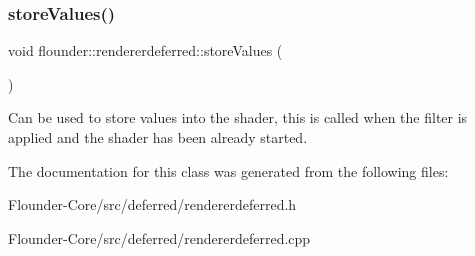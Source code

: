 \subsubsection{\texorpdfstring{store\+Values()}{storeValues()}}
{\footnotesize\ttfamily void flounder\+::rendererdeferred\+::store\+Values (\begin{DoxyParamCaption}{ }\end{DoxyParamCaption})\hspace{0.3cm}{\ttfamily [private]}}



Can be used to store values into the shader, this is called when the filter is applied and the shader has been already started. 



The documentation for this class was generated from the following files\+:\begin{DoxyCompactItemize}
\item 
Flounder-\/\+Core/src/deferred/rendererdeferred.\+h\item 
Flounder-\/\+Core/src/deferred/rendererdeferred.\+cpp\end{DoxyCompactItemize}
